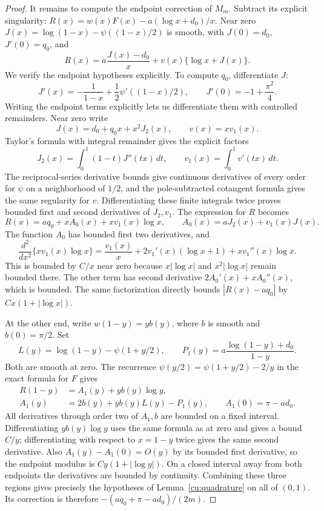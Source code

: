 \begin{proof}
It remains to compute the endpoint correction of $M_m$. Subtract its
explicit singularity:
$R(x)=w(x)F(x)-a(\log x+d_0)/x$.
Near zero $J(x)=\log(1-x)-\psi((1-x)/2)$ is smooth, with
$J(0)=d_0$, $J'(0)=q_0$, and
\[
 R(x)=a\frac{J(x)-d_0}{x}+v(x)\{\log x+J(x)\}.
\]
We verify the endpoint hypotheses explicitly.
To compute $q_0$, differentiate $J$:
\[
 J'(x)=-\frac1{1-x}+\frac12\psi'((1-x)/2),
 \qquad J'(0)=-1+\frac{\pi^2}{4}.
\]
Writing the endpoint terms explicitly lets us differentiate them with
controlled remainders. Near zero write
\[
 J(x)=d_0+q_0x+x^2J_2(x),\qquad v(x)=xv_1(x).
\]
Taylor's formula with integral remainder gives the explicit factors
\[
 J_2(x)=\int_0^1(1-t)J''(tx)\,dt,\qquad
 v_1(x)=\int_0^1v'(tx)\,dt.
\]
The reciprocal-series derivative bounds give continuous derivatives
of every order for $\psi$ on a neighborhood of $1/2$, and the pole-subtracted cotangent
formula gives the same regularity for $v$. Differentiating these finite
integrals twice proves bounded first and second derivatives of $J_2,v_1$.
The expression for $R$ becomes
\[
 R(x)=aq_0+xA_0(x)+xv_1(x)\log x,\qquad
 A_0(x)=aJ_2(x)+v_1(x)J(x).
\]
The function $A_0$ has bounded first two derivatives, and
\[
 \frac{d^2}{dx^2}\{xv_1(x)\log x\}
 =\frac{v_1(x)}x+2v_1'(x)(\log x+1)
                              +xv_1''(x)\log x.
\]
This is bounded by $C/x$ near zero because
$x|\log x|$ and $x^2|\log x|$ remain bounded there.
The other term has second derivative $2A_0'(x)+xA_0''(x)$,
which is bounded. The same factorization directly bounds
$|R(x)-aq_0|$ by $Cx(1+|\log x|)$.

At the other end, write $w(1-y)=yb(y)$, where $b$ is smooth
and $b(0)=\pi/2$. Set
\[
 L(y)=\log(1-y)-\psi(1+y/2),\qquad
 P_1(y)=a\frac{\log(1-y)+d_0}{1-y}.
\]
Both are smooth at zero. The recurrence
$\psi(y/2)=\psi(1+y/2)-2/y$ in the exact formula for $F$ gives
\[
 \begin{aligned}
 R(1-y)&=A_1(y)+yb(y)\log y,\\
 A_1(y)&=2b(y)+yb(y)L(y)-P_1(y),\qquad
 A_1(0)=\pi-ad_0.
 \end{aligned}
\]
All derivatives through order two of $A_1,b$ are bounded on a
fixed interval. Differentiating $yb(y)\log y$ uses the same
formula as at zero and gives a bound $C/y$; differentiating
with respect to $x=1-y$ twice gives the same second derivative.
Also $A_1(y)-A_1(0)=O(y)$ by its bounded first derivative,
so the endpoint modulus is $Cy(1+|\log y|)$.
On a closed interval away from both endpoints the derivatives
are bounded by continuity. Combining these three regions gives
precisely the hypotheses of
Lemma~\ref{cu:quadrature} on all of $(0,1)$. Its correction is
therefore $-(aq_0+\pi-ad_0)/(2m)$.


\end{proof}
